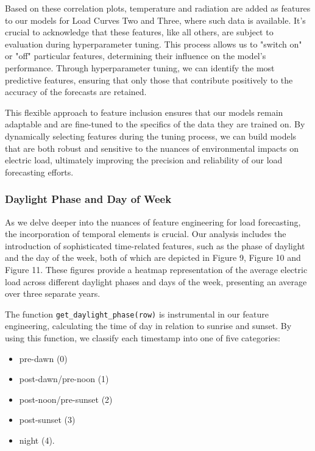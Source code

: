 \documentclass{article} %
\begin{document}
Based on these correlation plots, temperature and radiation are added as features to our models for Load Curves Two and Three, where such data is available. It's crucial to acknowledge that these features, like all others, are subject to evaluation during hyperparameter tuning. This process allows us to "switch on" or "off" particular features, determining their influence on the model's performance. Through hyperparameter tuning, we can identify the most predictive features, ensuring that only those that contribute positively to the accuracy of the forecasts are retained. 

This flexible approach to feature inclusion ensures that our models remain adaptable and are fine-tuned to the specifics of the data they are trained on. By dynamically selecting features during the tuning process, we can build models that are both robust and sensitive to the nuances of environmental impacts on electric load, ultimately improving the precision and reliability of our load forecasting efforts. 

\subsubsection{Daylight Phase and Day of Week }
As we delve deeper into the nuances of feature engineering for load forecasting, the incorporation of temporal elements is crucial. Our analysis includes the introduction of sophisticated time-related features, such as the phase of daylight and the day of the week, both of which are depicted in Figure 9, Figure 10 and Figure 11. These figures provide a heatmap representation of the average electric load across different daylight phases and days of the week, presenting an average over three separate years. 

The function \texttt{get\_daylight\_phase(row)} is instrumental in our feature engineering, calculating the time of day in relation to sunrise and sunset. By using this function, we classify each timestamp into one of five categories: 

\begin{itemize}
    \item pre-dawn (0)
    \item post-dawn/pre-noon (1)
    \item post-noon/pre-sunset (2)
    \item post-sunset (3)
    \item night (4).
\end{itemize}
\end{document}
